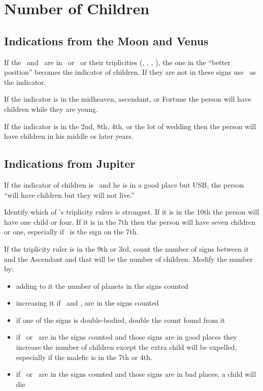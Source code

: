\section{Number of Children}
\subsection{Indications from the Moon and Venus}
If the \Moon\, and \Venus\, are in \Cancer\, or \Capricorn\, or their triplicities (\Scorpio, \Pisces, \Taurus, \Virgo), the one in the ``better position'' becomes the indicator of children. If they are not in these signs use \Jupiter\, as the indicator.

If the indicator is in the midheaven, ascendant, or Fortune the person will have children while they are young. 

If the indicator is in the 2nd, 8th, 4th, or the lot of wedding then the person will have children in his middle or later years.

\subsection{Indications from Jupiter}
If the indicator of children is \Jupiter\, and he is in a good place but USB, the person ``will have children but they will not live.''

Identify which of \Jupiter's triplicity rulers is strongest. If it is in the 10th the person will have one child or four. If it is in the 7th then the person will have seven children or one, especially if \Aries\, is the sign on the 7th.

If the triplicity ruler is in the 9th or 3rd, count the number of signs between it and the Ascendant and that will be the number of children. Modify the number by:
\begin{itemize}[topsep=0em,itemsep=0em]
\item adding to it the number of planets in the signs counted
\item increasing it if \Jupiter\, and \Venus, are in the signs counted
\item if one of the signs is double-bodied, double the count found from it
\item if \Saturn\, or \Mars\, are in the signs counted and those signs are in good places they increase the number of children except the extra child will be expelled, especially if the malefic is in the 7th or 4th. 
\item if \Saturn\, or \Mars\, are in the signs counted and those signs are in bad places, a child will die
\end{itemize}






